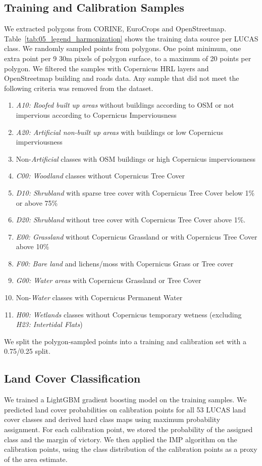 \subsection{Training and Calibration Samples}
We extracted polygons from CORINE, EuroCrops and OpenStreetmap. Table~\ref{tab:05_legend_harmonization} shows the training data source per LUCAS class. We randomly sampled points from polygons. One point minimum, one extra point per 9 30m pixels of polygon surface, to a maximum of 20 points per polygon.
We filtered the samples with Copernicus HRL layers and OpenStreetmap building and roads data. Any sample that did not meet the following criteria was removed from the dataset.
\begin{enumerate}
    \item \textit{A10: Roofed built up areas} without buildings according to OSM or not impervious according to Copernicus Imperviousness
    \item \textit{A20: Artificial non-built up areas} with buildings or low Copernicus imperviousness
    \item Non-\textit{Artificial} classes with OSM buildings or high Copernicus imperviousness
    \item \textit{C00: Woodland} classes without Copernicus Tree Cover
    \item \textit{D10: Shrubland} with sparse tree cover with Copernicus Tree Cover below 1\% or above 75\%
    \item \textit{D20: Shrubland} without tree cover with Copernicus Tree Cover above 1\%.
    \item \textit{E00: Grassland} without Copernicus Grassland or with Copernicus Tree Cover above 10\%
    \item \textit{F00: Bare land} and lichens/moss with Copernicus Grass or Tree cover
    \item \textit{G00: Water areas} with Copernicus Grassland or Tree Cover
    \item Non-\textit{Water} classes with Copernicus Permanent Water
    \item \textit{H00: Wetlands} classes without Copernicus temporary wetness (excluding \textit{H23: Intertidal Flats})
\end{enumerate}

We split the polygon-sampled points into a training and calibration set with a 0.75/0.25 split.

\subsection{Land Cover Classification}
We trained a LightGBM gradient boosting model \citep{ke2017lightgbm} on the training samples.
We predicted land cover probabilities on calibration points for all 53 LUCAS land cover classes and derived hard class maps using maximum probability assignment. For each calibration point, we stored the probability of the assigned class and the margin of victory.
We then applied the IMP algorithm on the calibration points, using the class distribution of the calibration points as a proxy of the area estimate.

